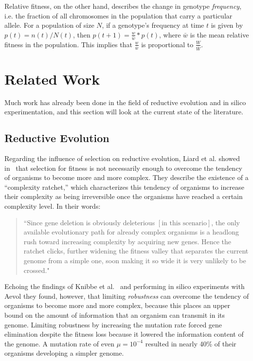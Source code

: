 Relative fitness, on the other hand, describes the change in genotype \textit{frequency}, i.e. the fraction of all chromosomes in the population that carry a particular allele. For a population of size $N$, if a genotype's frequency at time $t$ is given by $p(t) = n(t)/N(t)$, then $p(t+1) = \frac{w}{\bar{w}}*p(t)$, where $\bar{w}$ is the mean relative fitness in the population. This implies that $\frac{w}{\bar{w}}$ is proportional to $\frac{W}{\bar{W}}$. 

 

\section{Related Work}\label{related_work}



Much work has already been done in the field of reductive evolution and in silico experimentation, and this section will look at the current state of the literature. 

\subsection{Reductive Evolution}
Regarding the influence of selection on reductive evolution, Liard et al. showed in~\cite{Liard.2018} that selection for fitness is not necessarily enough to overcome the tendency of organisms to become more and more complex. They describe the existence of a ``complexity ratchet,'' which characterizes this tendency of organisms to increase their complexity as being irreversible once the organisms have reached a certain complexity level. In their words:
\begin{quote}
	``Since gene deletion is obviously deleterious $\left[\text{in this scenario}\right]$, the only available evolutionary path for already complex organisms is a headlong rush toward increasing complexity by acquiring new genes. Hence the ratchet clicks, further widening the fitness valley that separates the current genome from a simple one, soon making it so wide it is very unlikely to be crossed."
\end{quote} 
Echoing the findings of Knibbe et al.~\cite{Knibbe2007} and performing in silico experiments with Aevol they found, however, that limiting \textit{robustness} can overcome the tendency of organisms to become more and more complex, because this places an upper bound on the amount of information that an organism can transmit in its genome. Limiting robustness by increasing the mutation rate forced gene elimination despite the fitness loss because it lowered the information content of the genome. A mutation rate of even $\mu = 10^{-4}$ resulted in nearly 40\% of their organisms developing a simpler genome.

